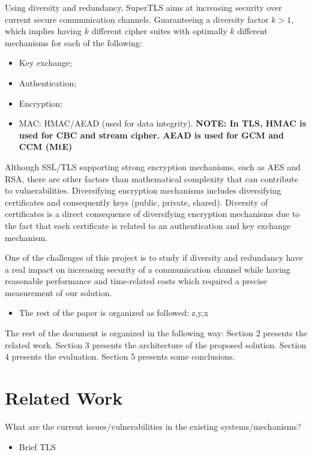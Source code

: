 \documentclass{sig-alternate-05-2015}
\begin{document}
Using diversity and redundancy, SuperTLS aims at increasing security over current secure communication channels.
Guaranteeing a diversity factor $k > 1$, which implies having $k$ different cipher suites with optimally $k$ different mechanisms for each of the following:
\begin{itemize}
\item Key exchange;
\item Authentication;
\item Encryption;
\item {MAC: HMAC/AEAD (used for data integrity). \textbf{NOTE: In TLS, HMAC is used for CBC and stream cipher. AEAD is used for GCM and CCM (MtE)}}
\end{itemize}

Although SSL/TLS supporting strong encryption mechanisms, such as AES and RSA, there are other factors than mathematical complexity that can contribute to vulnerabilities.
Diversifying encryption mechanisms includes diversifying certificates and consequently keys (public, private, shared).
Diversity of certificates is a direct consequence of diversifying encryption mechanisms due to the fact that each certificate is related to an authentication and key exchange mechanism.

One of the challenges of this project is to study if diversity and redundancy have a real impact on increasing security of a communication channel while having reasonable performance and time-related costs which required a precise measurement of our solution.

\begin{itemize}
	\item The rest of the paper is organized as followed: z,y,x
\end{itemize}

The rest of the document is organized in the following way: Section 2 presents the related work. Section 3 presents the architecture of the proposed solution. Section 4 presents the evaluation. Section 5 presents some conclusions.

\section{Related Work}
\label{sec-related-work}

What are the current issues/vulnerabilities in the existing systems/mechanisms? 

\begin{itemize}
	\item{Brief TLS}
\end{itemize}
\end{document}
